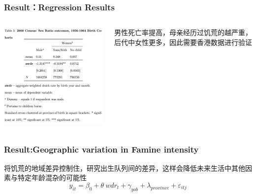 \documentclass{beamer}
\begin{document}
\begin{frame}
\frametitle{Result：Regression Results}
	\begin{columns}
            \begin{minipage}[c][0.4\textheight][c]{\linewidth}
                \centering
                \includegraphics[width=1\linewidth]{table3}
            \end{minipage}
           
           	\begin{minipage}[c][0.4\textheight][c]{\linewidth}
            男性死亡率提高，母亲经历过饥荒的越严重，后代中女性更多，因此需要香港数据进行验证
            \end{minipage}
    \end{columns}
\end{frame}

\begin{frame}
	\frametitle{Result:Geographic variation in Famine intensity}
    将饥荒的地域差异控制住，研究出生队列间的差异，这样会降低未来生活中其他因素与特定年龄混杂的可能性
$$y_{it}=\beta_0+\theta~wdr_t+\gamma_{yob}+\lambda_{province}+\varepsilon_{itj}$$


\end{frame}

\begin{frame}
	\frametitle{}
\end{frame}

\begin{frame}
	\frametitle{}
\end{frame}
\end{document}
